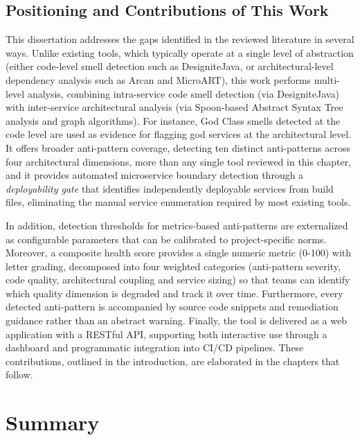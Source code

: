 \subsection{Positioning and Contributions of This Work}
\label{subsec:positioning}

\par This dissertation addresses the gaps identified in the reviewed literature in several ways. Unlike existing tools, which typically operate at a single level of abstraction (either code-level smell detection such as DesigniteJava, or architectural-level dependency analysis such as Arcan and MicroART), this work performs multi-level analysis, combining intra-service code smell detection (via DesigniteJava) with inter-service architectural analysis (via Spoon-based Abstract Syntax Tree analysis and graph algorithms). For instance, God Class smells detected at the code level are used as evidence for flagging god services at the architectural level. It offers broader anti-pattern coverage, detecting ten distinct anti-patterns across four architectural dimensions, more than any single tool reviewed in this chapter, and it provides automated microservice boundary detection through a \textit{deployability gate} that identifies independently deployable services from build files, eliminating the manual service enumeration required by most existing tools.

\par In addition, detection thresholds for metrics-based anti-patterns are externalized as configurable parameters that can be calibrated to project-specific norms. Moreover, a composite health score provides a single numeric metric (0-100) with letter grading, decomposed into four weighted categories (anti-pattern severity, code quality, architectural coupling and service sizing) so that teams can identify which quality dimension is degraded and track it over time. Furthermore, every detected anti-pattern is accompanied by source code snippets and remediation guidance rather than an abstract warning. Finally, the tool is delivered as a web application with a RESTful API, supporting both interactive use through a dashboard and programmatic integration into CI/CD pipelines. These contributions, outlined in the introduction, are elaborated in the chapters that follow.

\section{Summary}
\label{sec:summary}


